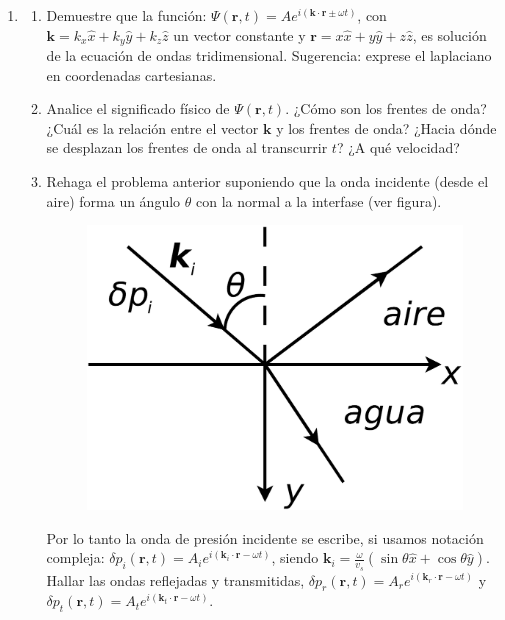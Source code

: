 \documentclass[11pt,spanish,a4paper]{article}
\begin{document}
\begin{enumerate}
\item 
\begin{enumerate}
\item Demuestre que la función: $\Psi(\mathbf{r},t)=Ae^{i(\mathbf{k}\cdot\mathbf{r}\pm\omega t)}$,
con $\mathbf{k}=k_{x}\hat{x}+k_{y}\hat{y}+k_{z}\hat{z}$ un vector
constante y $\mathbf{r}=x\hat{x}+y\hat{y}+z\hat{z}$, es solución
de la ecuación de ondas tridimensional. Sugerencia: exprese el laplaciano
en coordenadas cartesianas.
\item Analice el significado físico de $\Psi(\mathbf{r},t)$. ¿Cómo son
los frentes de onda? ¿Cuál es la relación entre el vector $\mathbf{k}$
y los frentes de onda? ¿Hacia dónde se desplazan los frentes de onda
al transcurrir $t$? ¿A qué velocidad?
\item Rehaga el problema anterior suponiendo que la onda incidente (desde
el aire) forma un ángulo $\theta$ con la normal a la interfase (ver
figura).
\begin{figure}[H]
\centering{}\includegraphics[clip,scale=0.25]{ej2-13}
\end{figure}
 Por lo tanto la onda de presión incidente se escribe, si usamos notación
 compleja: $\delta p_{i}(\mathbf{r},t)=A_{i}e^{i(\mathbf{k}_{i}\cdot\mathbf{r}-\omega t)}$,
 siendo $\mathbf{k}_{i}=\frac{\omega}{v_{s}}\left(\sin\theta\hat{x}+\cos\theta\hat{y}\right)$.
 Hallar las ondas reflejadas y transmitidas, $\delta p_{r}(\mathbf{r},t)=A_{r}e^{i(\mathbf{k}_{r}\cdot\mathbf{r}-\omega t)}$
 y $\delta p_{t}(\mathbf{r},t)=A_{t}e^{i(\mathbf{k}_{t}\cdot\mathbf{r}-\omega t)}$.
\end{enumerate}




\end{enumerate}
\end{document}
